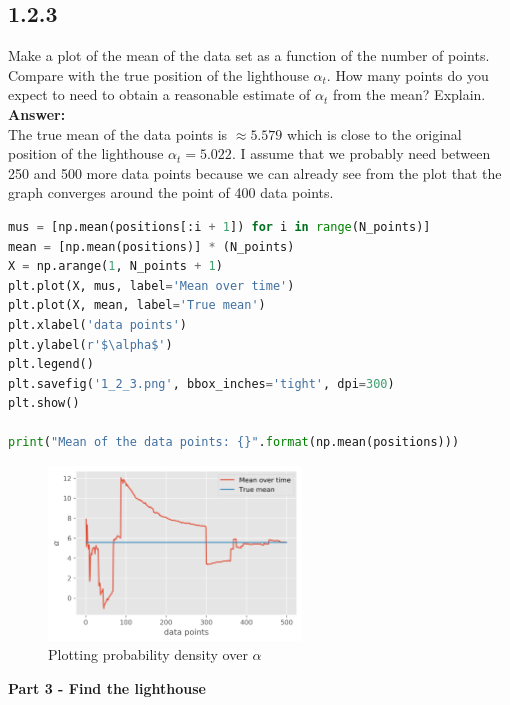 \documentclass[a4paper]{article}
\begin{document}
\subsection*{1.2.3}

Make a plot of the mean of the data set as a function of the number of points. Compare with the true position of the lighthouse $\alpha_t$. How many points do you expect to need to obtain a reasonable estimate of $\alpha_t$ from the mean? Explain.\\

\textbf{Answer:}\\

The true mean of the data points is $\approx 5.579$ which is close to the original position of the lighthouse $\alpha_t = 5.022$. I assume that we probably need between 250 and 500 more data points because we can already see from the plot that the graph converges around the point of 400 data points.\\

\begin{lstlisting}[language=Python]
mus = [np.mean(positions[:i + 1]) for i in range(N_points)]
mean = [np.mean(positions)] * (N_points)
X = np.arange(1, N_points + 1)
plt.plot(X, mus, label='Mean over time')
plt.plot(X, mean, label='True mean')
plt.xlabel('data points')
plt.ylabel(r'$\alpha$')
plt.legend()
plt.savefig('1_2_3.png', bbox_inches='tight', dpi=300)
plt.show()

print("Mean of the data points: {}".format(np.mean(positions)))
\end{lstlisting}

\begin{figure}[H]
\center
\includegraphics[width=0.6\textwidth]{Images/1_2_3.png}
\caption{Plotting probability density over $\alpha$}
\label{fig:114}
\end{figure}

\textbf{Part 3 - Find the lighthouse}\\
\end{document}
